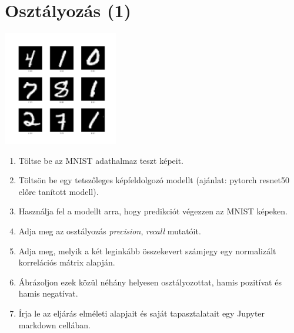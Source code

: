 \documentclass[english]{article}
\begin{document}
\section{Osztályozás (1)}
\begin{center}
\includegraphics[width=5cm, keepaspectratio]{images/mnist.png}
\end{center}
\begin{enumerate}
	\item Töltse be az MNIST adathalmaz teszt képeit.
	\item Töltsön be egy tetszőleges képfeldolgozó modellt (ajánlat: pytorch resnet50 előre tanított modell).
	\item Használja fel a modellt arra, hogy predikciót végezzen az MNIST képeken.
	\item Adja meg az osztályozás \emph{precision}, \emph{recall} mutatóit. 
	\item Adja meg, melyik a két leginkább összekevert számjegy egy normalizált korrelációs mátrix alapján.
	\item Ábrázoljon ezek közül néhány helyesen osztályozottat, hamis pozitívat és hamis negatívat. 
	\item Írja le az eljárás elméleti alapjait és saját tapasztalatait egy Jupyter markdown cellában.
\end{enumerate}
\end{document}
